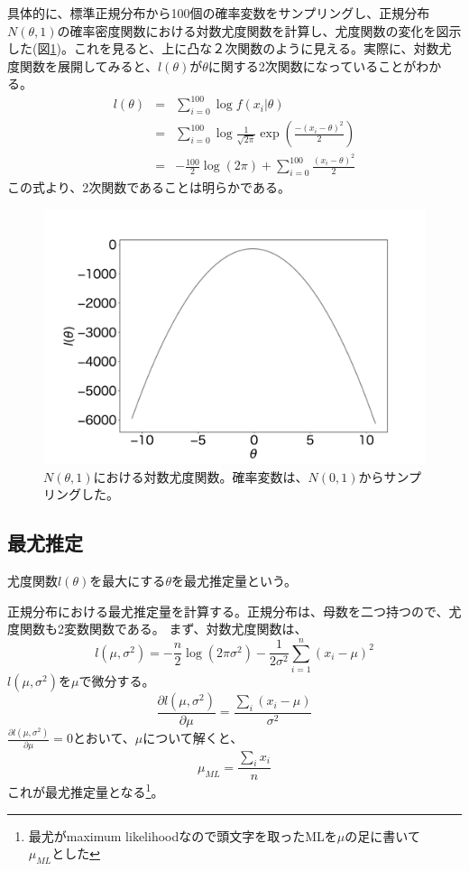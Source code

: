 具体的に、標準正規分布から100個の確率変数をサンプリングし、正規分布$N(\theta,1)$の確率密度関数における対数尤度関数を計算し、尤度関数の変化を図示した(図\ref{fig:loglikelihood_function})。これを見ると、上に凸な２次関数のように見える。実際に、対数尤度関数を展開してみると、$l(\theta)$が$\theta$に関する2次関数になっていることがわかる。
\begin{eqnarray}
    l(\theta) &=& \sum_{i=0}^{100} \log f(x_i|\theta) \\
    &=& \sum_{i=0}^{100} \log \frac{1}{\sqrt{2\pi}}\exp\left( \frac{-(x_i-\theta)^2}{2} \right) \\
    &=&  -\frac{100}{2}\log(2\pi)+\sum_{i=0}^{100}\frac{(x_i-\theta)^2}{2}
\end{eqnarray}
この式より、2次関数であることは明らかである。

\begin{figure}
    \centering
    \includegraphics[width=15cm]{./image/02_/loglikelihood_function.pdf}
    \caption{$N(\theta,1)$における対数尤度関数。確率変数は、$N(0,1)$からサンプリングした。}
    \label{fig:loglikelihood_function}
\end{figure}

\subsection{最尤推定}
\begin{defi}
    尤度関数$l(\theta)$を最大にする$\theta$を最尤推定量という。
\end{defi}
正規分布における最尤推定量を計算する。正規分布は、母数を二つ持つので、尤度関数も2変数関数である。
まず、対数尤度関数は、
\begin{equation*}
    l(\mu,\sigma^2) = -\frac{n}{2}\log(2\pi\sigma^2)-\frac{1}{2\sigma^2}\sum_{i=1}^n(x_i-\mu)^2 
\end{equation*}
$l(\mu,\sigma^2)$を$\mu$で微分する。
\begin{equation*}
    \frac{\partial l(\mu,\sigma^2)}{\partial \mu} = \frac{\sum_i(x_i-\mu)}{\sigma^2}
\end{equation*}
$\frac{\partial l(\mu,\sigma^2)}{\partial \mu} = 0$とおいて、$\mu$について解くと、
\begin{equation*}
    \mu_{ML} = \frac{\sum_i x_i}{n}
\end{equation*}
これが最尤推定量となる\footnote{最尤がmaximum likelihoodなので頭文字を取ったMLを$\mu$の足に書いて$\mu_{ML}とした$}。


